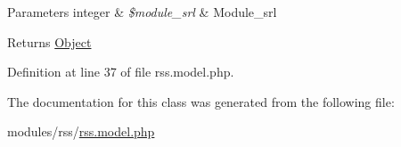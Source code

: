 \begin{DoxyParams}[1]{Parameters}
integer & {\em \$module\+\_\+srl} & Module\+\_\+srl \\
\hline
\end{DoxyParams}
\begin{DoxyReturn}{Returns}
\hyperlink{classObject}{Object} 
\end{DoxyReturn}


Definition at line 37 of file rss.\+model.\+php.



The documentation for this class was generated from the following file\+:\begin{DoxyCompactItemize}
\item 
modules/rss/\hyperlink{rss_8model_8php}{rss.\+model.\+php}\end{DoxyCompactItemize}
